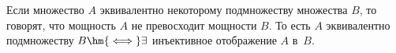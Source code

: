 
Если множество $A$ эквивалентно некоторому подмножеству множества $B$, то говорят, что мощность $A$ не превосходит мощности $B$.
 То есть $A$ эквивалентно подмножеству $B \hm{\iff} \exists$ инъективное отображение $A$ в~$B$.

